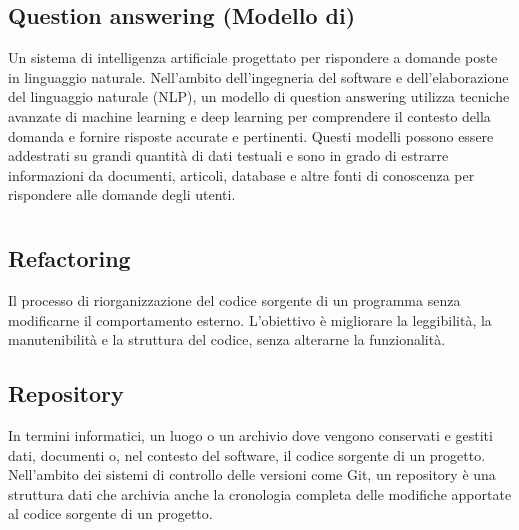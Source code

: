 \hypertarget{sec:question_answering}{}
\subsection*{Question answering (Modello di)}
Un sistema di intelligenza artificiale progettato per rispondere a domande poste in linguaggio naturale. Nell'ambito dell'ingegneria 
del software e dell'elaborazione del linguaggio naturale (NLP), un modello di question answering utilizza tecniche avanzate di 
machine learning e deep learning per comprendere il contesto della domanda e fornire risposte accurate e pertinenti. Questi modelli 
possono essere addestrati su grandi quantità di dati testuali e sono in grado di estrarre informazioni da documenti, articoli, 
database e altre fonti di conoscenza per rispondere alle domande degli utenti.


\newpage



\section{}

\hypertarget{sec:refactoring}{}
\subsection*{Refactoring}
Il processo di riorganizzazione del codice sorgente di un programma senza modificarne il comportamento esterno. L'obiettivo è 
migliorare la leggibilità, la manutenibilità e la struttura del codice, senza alterarne la funzionalità.

\subsection*{Repository}
In termini informatici, un luogo o un archivio dove vengono conservati e gestiti dati, documenti o, nel contesto del software, il codice sorgente di un 
progetto. Nell'ambito dei sistemi di controllo delle versioni come Git, un repository è una struttura dati che archivia anche la cronologia completa delle 
modifiche apportate al codice sorgente di un progetto.

\hypertarget{sec:repository_arch_esagonale}{}
